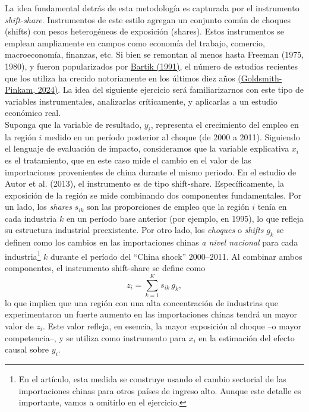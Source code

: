 \documentclass[a4paper, answers, addpoints, 11pt]{exam}
\begin{document}
La idea fundamental detrás de esta metodología es capturada por el instrumento \textit{shift-share}. Instrumentos de este estilo agregan un conjunto común de choques (shifts) con pesos heterogéneos de exposición (shares). Estos instrumentos se emplean ampliamente en campos como economía del trabajo, comercio, macroeconomía, finanzas, etc. Si bien se remontan al menos hasta Freeman (1975, 1980), y fueron popularizados por \href{https://ideas.repec.org/b/upj/ubooks/wbsle.html}{Bartik (1991)}, el número de estudios recientes que los utiliza ha crecido notoriamente en los últimos diez años \href{https://arxiv.org/abs/2405.20604}{(Goldsmith-Pinkam, 2024)}. La idea del siguiente ejercicio será familiarizarnos con este tipo de variables instrumentales, analizarlas críticamente, y aplicarlas a un estudio económico real. \\

Suponga que la variable de resultado, \(y_i\), representa el crecimiento del empleo en la región \(i\) medido en un período posterior al choque (de 2000 a 2011). Siguiendo el lenguaje de evaluación de impacto, consideramos que la variable explicativa \(x_i\) es el tratamiento, que en este caso mide el cambio en el valor de las importaciones provenientes de china durante el mismo periodo. En el estudio de Autor et al. (2013), el instrumento es de tipo shift-share. Específicamente, la exposición de la región se mide combinando dos componentes fundamentales. Por un lado, los \emph{shares} \(s_{ik}\) son las proporciones de empleo que la región \(i\) tenía en cada industria \(k\) en un período base anterior (por ejemplo, en 1995), lo que refleja su estructura industrial preexistente. Por otro lado, los \emph{choques} o \emph{shifts} \(g_k\) se definen como los cambios en las importaciones chinas \textit{a nivel nacional} para cada industria\footnote{En el artículo, esta medida se construye usando el cambio sectorial de las importaciones chinas para otros países de ingreso alto. Aunque este detalle es importante, vamos a omitirlo en el ejercicio.} \(k\) durante el período del ``China shock'' 2000–2011. Al combinar ambos componentes, el instrumento shift-share se define como
\[
z_i = \sum_{k=1}^{K} s_{ik}\,g_k, \label{eq:shift-share} \tag{1}
\]
lo que implica que una región con una alta concentración de industrias que experimentaron un fuerte aumento en las importaciones chinas tendrá un mayor valor de \(z_i\). Este valor refleja, en esencia, la mayor exposición al choque –o mayor competencia–, y se utiliza como instrumento para \(x_i\) en la estimación del efecto causal sobre \(y_i\). \\
\end{document}

